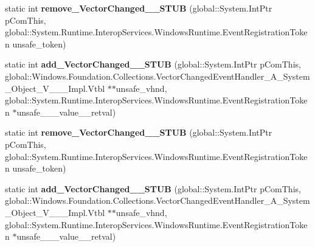 \begin{DoxyCompactItemize}
static int {\bfseries remove\+\_\+\+Vector\+Changed\+\_\+\+\_\+\+S\+T\+UB} (global\+::\+System.\+Int\+Ptr p\+Com\+This, global\+::\+System.\+Runtime.\+Interop\+Services.\+Windows\+Runtime.\+Event\+Registration\+Token unsafe\+\_\+token)
\item 
\mbox{\label{struct_windows_1_1_foundation_1_1_collections_1_1_i_observable_vector___a___system___object___v_______impl_1_1_vtbl_a73603b0a65e801f868e563087158e9af}} 
static int {\bfseries add\+\_\+\+Vector\+Changed\+\_\+\+\_\+\+S\+T\+UB} (global\+::\+System.\+Int\+Ptr p\+Com\+This, global\+::\+Windows.\+Foundation.\+Collections.\+Vector\+Changed\+Event\+Handler\+\_\+\+A\+\_\+\+System\+\_\+\+Object\+\_\+\+V\+\_\+\+\_\+\+\_\+\+Impl.\+Vtbl $\ast$$\ast$unsafe\+\_\+vhnd, global\+::\+System.\+Runtime.\+Interop\+Services.\+Windows\+Runtime.\+Event\+Registration\+Token $\ast$unsafe\+\_\+\+\_\+\+\_\+value\+\_\+\+\_\+retval)
\item 
\mbox{\label{struct_windows_1_1_foundation_1_1_collections_1_1_i_observable_vector___a___system___object___v_______impl_1_1_vtbl_aabf887f0240da466ea88505e0d04bc08}} 
static int {\bfseries remove\+\_\+\+Vector\+Changed\+\_\+\+\_\+\+S\+T\+UB} (global\+::\+System.\+Int\+Ptr p\+Com\+This, global\+::\+System.\+Runtime.\+Interop\+Services.\+Windows\+Runtime.\+Event\+Registration\+Token unsafe\+\_\+token)
\item 
\mbox{\label{struct_windows_1_1_foundation_1_1_collections_1_1_i_observable_vector___a___system___object___v_______impl_1_1_vtbl_a73603b0a65e801f868e563087158e9af}} 
static int {\bfseries add\+\_\+\+Vector\+Changed\+\_\+\+\_\+\+S\+T\+UB} (global\+::\+System.\+Int\+Ptr p\+Com\+This, global\+::\+Windows.\+Foundation.\+Collections.\+Vector\+Changed\+Event\+Handler\+\_\+\+A\+\_\+\+System\+\_\+\+Object\+\_\+\+V\+\_\+\+\_\+\+\_\+\+Impl.\+Vtbl $\ast$$\ast$unsafe\+\_\+vhnd, global\+::\+System.\+Runtime.\+Interop\+Services.\+Windows\+Runtime.\+Event\+Registration\+Token $\ast$unsafe\+\_\+\+\_\+\+\_\+value\+\_\+\+\_\+retval)
\item 
\mbox{\label{struct_windows_1_1_foundation_1_1_collections_1_1_i_observable_vector___a___system___object___v_______impl_1_1_vtbl_aabf887f0240da466ea88505e0d04bc08}} 

\end{DoxyCompactItemize}
